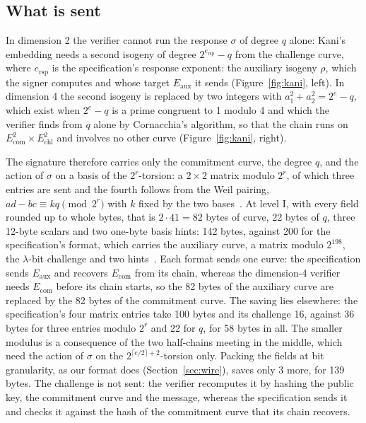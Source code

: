 \documentclass[version=preprint]{iacrcc}
\newcommand{\Ecom}{E_{\mathrm{com}}}
\newcommand{\Echl}{E_{\mathrm{chl}}}
\newcommand{\Eaux}{E_{\mathrm{aux}}}
\begin{document}
    \subsection{What is sent}
    \label{sec:format}
    In dimension 2 the verifier cannot run the response $\sigma$ of degree $q$
    alone: Kani's embedding needs a second isogeny of degree
    $2^{e_{\mathrm{rsp}}} - q$ from the challenge curve, where
    $e_{\mathrm{rsp}}$ is the specification's response exponent: the auxiliary
    isogeny $\rho$, which the signer computes
    and whose target $\Eaux$ it sends (Figure~\ref{fig:kani}, left). In
    dimension 4 the second isogeny is replaced by two integers with $a_1^2 +
    a_2^2 = 2^e - q$, which exist when $2^e - q$ is a prime congruent to 1
    modulo 4 and which the verifier finds from $q$ alone by Cornacchia's
    algorithm, so that the chain runs on $\Ecom^2 \times \Echl^2$ and involves
    no other curve (Figure~\ref{fig:kani}, right).

    The signature therefore carries only the commitment curve, the degree $q$,
    and the action of $\sigma$ on a basis of the $2^r$-torsion: a $2 \times 2$
    matrix modulo $2^r$, of which three entries are sent and the fourth follows
    from the Weil pairing, $ad - bc \equiv kq \pmod{2^r}$ with $k$ fixed by
    the two bases~\cite[Section 6.1]{DLRW24}. At level I, with every field rounded up to whole
    bytes, that is $2 \cdot 41 = 82$ bytes of curve, 22 bytes of $q$, three
    12-byte scalars and two one-byte basis hints: 142 bytes, against 200 for
    the specification's format, which carries the auxiliary curve, a matrix
    modulo $2^{198}$, the $\lambda$-bit challenge and two hints~\cite[Chapter
    6]{AAA+26}. Each format sends one curve: the specification sends $\Eaux$
    and recovers $\Ecom$ from its chain, whereas the dimension-4 verifier needs
    $\Ecom$ before its chain starts, so the 82 bytes of the auxiliary curve are
    replaced by the 82 bytes of the commitment curve. The saving lies
    elsewhere: the specification's four matrix entries take 100 bytes and its
    challenge 16, against 36 bytes for three entries modulo $2^r$ and 22 for
    $q$, for 58 bytes in all. The smaller modulus is a consequence of the two
    half-chains meeting in the middle, which need the action of $\sigma$ on the
    $2^{\lceil e/2 \rceil + 2}$-torsion only. Packing the fields at bit
    granularity, as our format does (Section~\ref{sec:wire}), saves only 3
    more, for 139 bytes. The challenge is not sent: the verifier recomputes it
    by hashing the public key, the commitment curve and the message, whereas
    the specification sends it and checks it against the hash of the
    commitment curve that its chain recovers.
\end{document}
